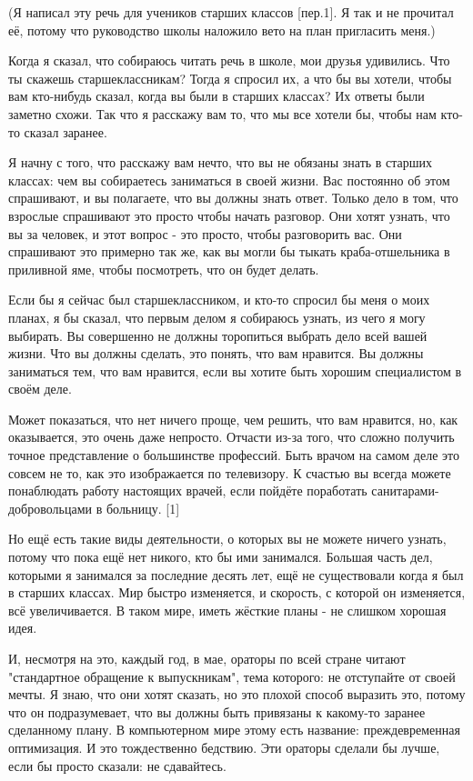 \documentclass[ebook,12pt,oneside,openany]{memoir}
\author{Пол Грэм} \date{}
\begin{document}
\maketitle

(Я написал эту речь для учеников старших классов [пер.1]. Я так и не
прочитал её, потому что руководство школы наложило вето на план
пригласить меня.)

Когда я сказал, что собираюсь читать речь в школе, мои друзья
удивились. Что ты скажешь старшеклассникам? Тогда я спросил их, а что
бы вы хотели, чтобы вам кто-нибудь сказал, когда вы были в старших
классах? Их ответы были заметно схожи. Так что я расскажу вам то, что
мы все хотели бы, чтобы нам кто-то сказал заранее.

Я начну с того, что расскажу вам нечто, что вы не обязаны знать в
старших классах: чем вы собираетесь заниматься в своей жизни. Вас
постоянно об этом спрашивают, и вы полагаете, что вы должны знать
ответ. Только дело в том, что взрослые спрашивают это просто чтобы
начать разговор. Они хотят узнать, что вы за человек, и этот вопрос -
это просто, чтобы разговорить вас. Они спрашивают это примерно так же,
как вы могли бы тыкать краба-отшельника в приливной яме, чтобы
посмотреть, что он будет делать.

Если бы я сейчас был старшеклассником, и кто-то спросил бы меня о моих
планах, я бы сказал, что первым делом я собираюсь узнать, из чего я
могу выбирать. Вы совершенно не должны торопиться выбрать дело всей
вашей жизни. Что вы должны сделать, это понять, что вам нравится. Вы
должны заниматься тем, что вам нравится, если вы хотите быть хорошим
специалистом в своём деле.

Может показаться, что нет ничего проще, чем решить, что вам нравится,
но, как оказывается, это очень даже непросто. Отчасти из-за того, что
сложно получить точное представление о большинстве профессий. Быть
врачом на самом деле это совсем не то, как это изображается по
телевизору. К счастью вы всегда можете понаблюдать работу настоящих
врачей, если пойдёте поработать санитарами-добровольцами в больницу.
[1]

Но ещё есть такие виды деятельности, о которых вы не можете ничего
узнать, потому что пока ещё нет никого, кто бы ими занимался. Большая
часть дел, которыми я занимался за последние десять лет, ещё не
существовали когда я был в старших классах. Мир быстро изменяется, и
скорость, с которой он изменяется, всё увеличивается. В таком мире,
иметь жёсткие планы - не слишком хорошая идея.

И, несмотря на это, каждый год, в мае, ораторы по всей стране читают
"стандартное обращение к выпускникам", тема которого: не отступайте от
своей мечты. Я знаю, что они хотят сказать, но это плохой способ
выразить это, потому что он подразумевает, что вы должны быть
привязаны к какому-то заранее сделанному плану. В компьютерном мире
этому есть название: преждевременная оптимизация. И это тождественно
бедствию. Эти ораторы сделали бы лучше, если бы просто сказали: не
сдавайтесь.
\end{document}
